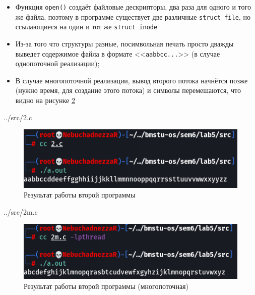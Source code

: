 \begin{itemize}
	\item Функция \texttt{open()} создаёт файловые дескрипторы, два раза для одного и того же файла, поэтому в программе существует две различные \texttt{struct file}, но ссылающиеся на один	и тот же \texttt{struct inode}

	\item Из-за того что структуры разные, посимвольная печать просто дважды выведет содержимое файла в формате <<\texttt{aabbcc...}>> (в случае однопоточной реализации);

	\item В случае многопоточной реализации, вывод второго потока начнётся позже (нужно время, для создание этого потока) и символы перемешаются, что видно на рисунке \ref{fig:res2m}
\end{itemize}

\clearpage

\begin{lstinputlisting}[
	caption={Исходный код второй программы},
	style={c},
	]{../src/2.c}
\end{lstinputlisting}

\begin{figure}[h!btp]
	\centering
	\includegraphics[width=490pt]{inc/2.png}
	\caption{Результат работы второй программы}
	\label{fig:res2}	
\end{figure}

\clearpage

\begin{lstinputlisting}[
	caption={Исходный код второй программы (многопоточная)},
	style={c},
	]{../src/2m.c}
\end{lstinputlisting}

\begin{figure}[h!btp]
	\includegraphics[width=490pt]{inc/2m.png}
	\caption{Результат работы второй программы (многопоточная)}
	\label{fig:res2m}	
\end{figure}

